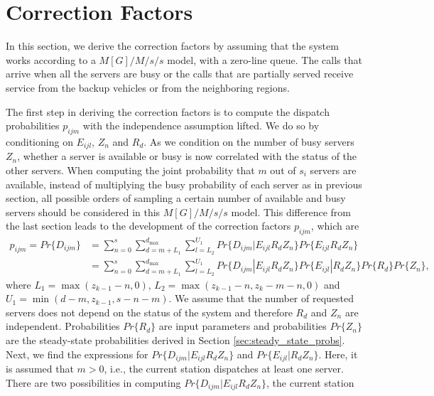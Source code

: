\documentclass[11pt]{article}\topmargin 0mm
\begin{document}
\section{Correction Factors}
\label{sec:correction_factors} In this section, we derive the
correction factors by assuming that the system works according
to a $M[G]/M/s/s$ model, with a zero-line queue. The calls that
arrive when all the servers are busy or the calls that are
partially served receive service from the backup vehicles or
from the neighboring regions.

The first step in deriving the correction factors is to compute
the dispatch probabilities $p_{ijm}$ with the independence
assumption lifted.  We do so by conditioning on $E_{ijl}$,
$Z_n$ and $R_d$. As we condition on the number of busy servers
$Z_n$, whether a server is available or busy is now correlated
with the status of the other servers. When computing the joint
probability that $m$ out of $s_i$ servers are available,
instead of multiplying the busy probability of each server as
in previous section, all possible orders of sampling a certain
number of available and busy servers should be considered in
this $M[G]/M/s/s$ model. This difference from the last section
leads to the development of the correction factors $p_{ijm}$,
which are
\begin{equation}
\label{eq:pijm1}
\begin{split}
p_{ijm} = Pr\{D_{ijm}\} & = \sum_{n=0}^s \sum_{d=m+L_1}^{d_{\max}} \sum_{l=L_2}^{U_1} Pr\{D_{ijm}|E_{ijl} R_d Z_n \}Pr\{E_{ijl} R_d Z_n\} \\
                        & = \sum_{n=0}^s \sum_{d=m+L_1}^{d_{\max}} \sum_{l=L_2}^{U_1} Pr\{D_{ijm}|E_{ijl} R_d Z_n\}Pr\{E_{ijl} | R_d Z_n\} Pr\{R_d\} Pr\{Z_n\},
\end{split}
\end{equation}
where $L_1=\max(z_{k-1}-n,0)$, $L_2=\max(z_{k-1}-n,z_k-m-n,0)$
and $U_1=\min(d-m,z_{k-1},s-n-m)$. We assume that the number of
requested servers does not depend on the status of the system
and therefore $R_d$ and $Z_n$ are independent. Probabilities
$Pr\{R_d\}$ are input parameters and probabilities $Pr\{Z_n\}$
are the steady-state probabilities derived in Section
\ref{sec:steady_state_probs}. Next, we find the expressions for
$Pr\{D_{ijm}|E_{ijl} R_d Z_n\}$ and $Pr\{E_{ijl} | R_d Z_n\}$.
Here, it is assumed that $m>0$, i.e., the current station
dispatches at least one server. There are two possibilities in
computing $Pr\{D_{ijm}|E_{ijl} R_d Z_n\}$, the current station
\end{document}
